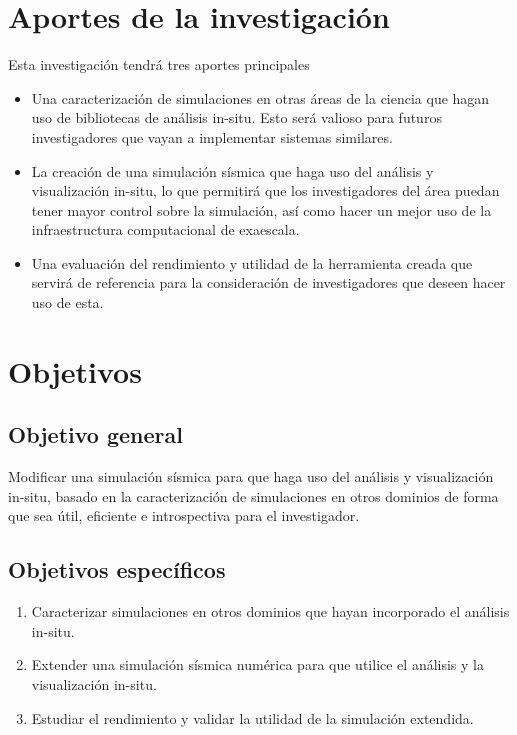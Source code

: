 \section{Aportes de la investigación}
Esta investigación tendrá tres aportes principales
\begin{itemize}
  \item Una caracterización de simulaciones en otras áreas de la ciencia que hagan uso de bibliotecas de análisis in-situ. Esto será valioso para futuros investigadores que vayan a implementar sistemas similares. 
  \item La creación de una simulación sísmica que haga uso del análisis y visualización in-situ, lo que permitirá que los investigadores del área puedan tener mayor control sobre la simulación, así como hacer un mejor uso de la infraestructura computacional de exaescala. 
  \item Una evaluación del rendimiento y utilidad de la herramienta creada que servirá de referencia para la consideración de investigadores que deseen hacer uso de esta. 
  
\end{itemize}

\section{Objetivos}
\subsection{Objetivo general}
Modificar una simulación sísmica para que haga uso del análisis y visualización in-situ, basado en la caracterización de simulaciones en otros dominios de forma que sea útil, eficiente e introspectiva para el investigador.
\subsection{Objetivos específicos}
\begin{enumerate}
  \item Caracterizar simulaciones en otros dominios que hayan incorporado el análisis in-situ. %
  \item Extender una simulación sísmica numérica para que utilice el análisis y la visualización in-situ. %
  \item Estudiar el rendimiento y validar la utilidad de la simulación extendida. %
\end{enumerate}
